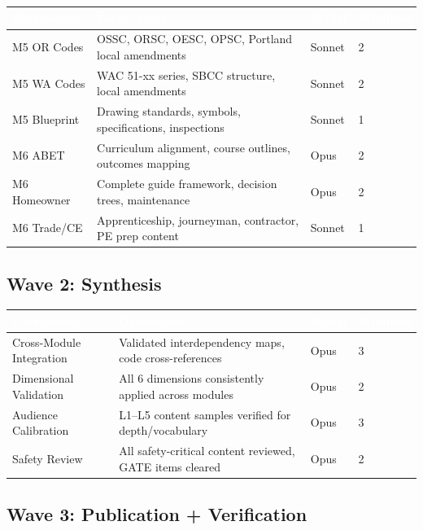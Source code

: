 \documentclass[11pt,letterpaper]{article}
\newcommand{\tableheader}[1]{\textbf{\sffamily\textcolor{white}{#1}}}
\begin{document}
\begin{center}
\begin{tabularx}{\textwidth}{L{2.5cm}XC{1.5cm}C{1.5cm}}
\toprule
{}
\tableheader{Component} & \tableheader{Focus Areas} & \tableheader{Model} & \tableheader{Windows} \\
\midrule
M5 OR Codes & OSSC, ORSC, OESC, OPSC, Portland local amendments & Sonnet & 2 \\
M5 WA Codes & WAC 51-xx series, SBCC structure, local amendments & Sonnet & 2 \\
M5 Blueprint & Drawing standards, symbols, specifications, inspections & Sonnet & 1 \\
M6 ABET & Curriculum alignment, course outlines, outcomes mapping & Opus & 2 \\
M6 Homeowner & Complete guide framework, decision trees, maintenance & Opus & 2 \\
M6 Trade/CE & Apprenticeship, journeyman, contractor, PE prep content & Sonnet & 1 \\
\bottomrule
\end{tabularx}
\end{center}

\subsection{Wave 2: Synthesis}

\begin{center}
\begin{tabularx}{\textwidth}{L{3cm}XC{1.5cm}C{1.5cm}}
\toprule
{}
\tableheader{Component} & \tableheader{Deliverable} & \tableheader{Model} & \tableheader{Windows} \\
\midrule
Cross-Module Integration & Validated interdependency maps, code cross-references & Opus & 3 \\
Dimensional Validation & All 6 dimensions consistently applied across modules & Opus & 2 \\
Audience Calibration & L1--L5 content samples verified for depth/vocabulary & Opus & 3 \\
Safety Review & All safety-critical content reviewed, GATE items cleared & Opus & 2 \\
\bottomrule
\end{tabularx}
\end{center}

\subsection{Wave 3: Publication + Verification}
\end{document}
